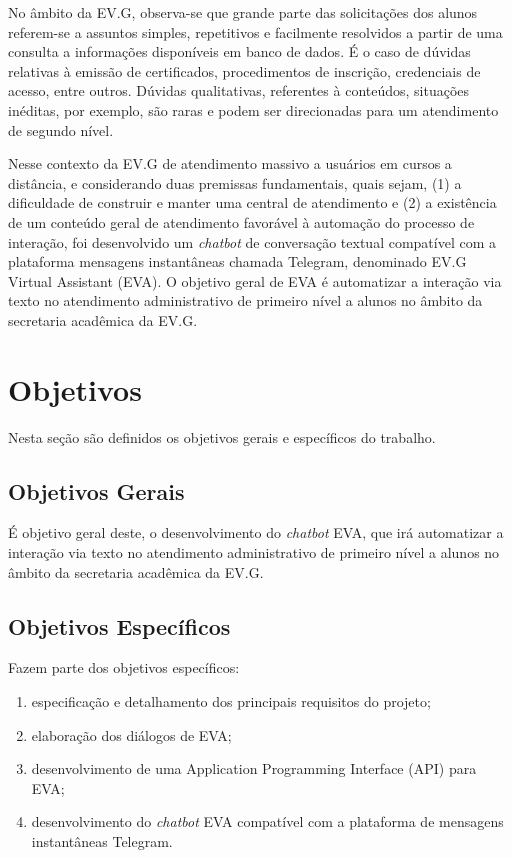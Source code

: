 No âmbito da EV.G, observa-se que grande parte das solicitações dos alunos referem-se a assuntos simples, repetitivos e facilmente resolvidos a partir de uma consulta a informações disponíveis em banco de dados. É o caso de dúvidas relativas à emissão de certificados, procedimentos de inscrição, credenciais de acesso, entre outros. Dúvidas qualitativas, referentes à conteúdos, situações inéditas, por exemplo, são raras e podem ser direcionadas para um atendimento de segundo nível.   

Nesse contexto da EV.G de atendimento massivo a usuários em cursos a distância, e considerando duas premissas fundamentais, quais sejam, (1) a dificuldade de construir e manter uma central de atendimento e (2) a existência de um conteúdo geral de atendimento favorável à automação do processo de interação, foi desenvolvido um \textit{chatbot} de conversação textual compatível com a plataforma mensagens instantâneas chamada Telegram, denominado EV.G Virtual Assistant (EVA). O objetivo geral de EVA é automatizar a interação via texto no atendimento administrativo de primeiro nível a alunos no âmbito da secretaria acadêmica da EV.G.

\section{Objetivos}\label{cap:01:sec:01:objetivos}

Nesta seção são definidos os objetivos gerais e específicos do trabalho.


\subsection{Objetivos Gerais}\label{cap:01:sec:01:sub:01:objetivo-geral}

É objetivo geral deste, o desenvolvimento do \textit{chatbot} EVA, que irá automatizar a interação via texto no atendimento administrativo de primeiro nível a alunos no âmbito da secretaria acadêmica da EV.G.


\subsection{Objetivos Específicos}\label{cap:01:sec:01:sub:02:ojetivos-especificos}

Fazem parte dos objetivos específicos:

\begin{enumerate}[label=\alph*)]
\tightlist
\item
especificação e detalhamento dos principais requisitos do projeto;
\item
elaboração dos diálogos de EVA;
\item 
desenvolvimento de uma Application Programming Interface (API) para EVA;
\item
desenvolvimento do \textit{chatbot} EVA compatível com a plataforma de mensagens instantâneas Telegram.
\end{enumerate}


